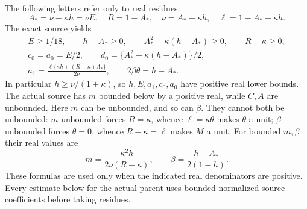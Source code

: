 The following letters refer only to real residues:
\[
 A_* =\nu-\kappa h=\nu E,\quad R=1-A_*,\quad
 \nu=A_*+\kappa h,\quad\ell=1-A_*-\kappa h.
 \tag{FU3}
\]
The exact source yields
\[
\begin{gathered}
 E\ge1/18,\qquad h-A_*\ge0,\qquad
 A_*^2-\kappa(h-A_*)\ge0,\qquad R-\kappa\ge0,\\
 c_0=a_0=E/2,\qquad
 d_0=\{A_*^2-\kappa(h-A_*)\}/2,\\
 a_1=\frac{\ell\{\kappa h+(R-\kappa)A_*\}}{2\nu},
 \qquad 2\beta\theta=h-A_*.
\end{gathered}\tag{FU4}
\]
In particular $h\ge\nu/(1+\kappa)$, so $h,E,a_1,c_0,a_0$
have positive real lower bounds. The actual source has $m$ bounded
below by a positive real, while $C,A$ are unbounded. Here $m$
can be unbounded, and so can $\beta$. They cannot both be unbounded:
$m$ unbounded forces $R=\kappa$, whence
$\ell=\kappa\theta$ makes $\theta$ a unit; $\beta$ unbounded
forces $\theta=0$, whence $R-\kappa=\ell$ makes $M$ a unit.
For bounded $m,\beta$ their real values are
\[
 m=\frac{\kappa^2h}{2\nu(R-\kappa)},\qquad
 \beta=\frac{h-A_*}{2(1-h)}.
 \tag{FU5}
\]
These formulas are used only when the indicated real denominators
are positive. Every estimate below for the actual parent uses
bounded normalized source coefficients before taking residues.

